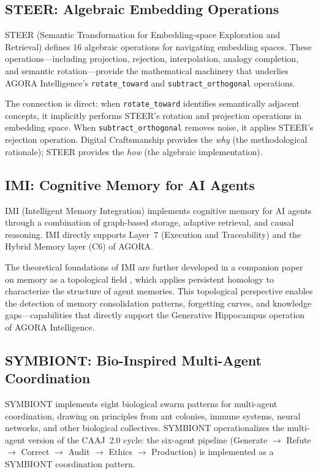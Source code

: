 \documentclass[11pt,a4paper]{article}
\begin{document}
\subsection{STEER: Algebraic Embedding Operations}

STEER (Semantic Transformation for Embedding-space Exploration and Retrieval) \citep{gomes2025steer} defines 16 algebraic operations for navigating embedding spaces. These operations---including projection, rejection, interpolation, analogy completion, and semantic rotation---provide the mathematical machinery that underlies AGORA Intelligence's \texttt{rotate\_toward} and \texttt{subtract\_orthogonal} operations.

The connection is direct: when \texttt{rotate\_toward} identifies semantically adjacent concepts, it implicitly performs STEER's rotation and projection operations in embedding space. When \texttt{subtract\_orthogonal} removes noise, it applies STEER's rejection operation. Digital Craftsmanship provides the \emph{why} (the methodological rationale); STEER provides the \emph{how} (the algebraic implementation).

\subsection{IMI: Cognitive Memory for AI Agents}

IMI (Intelligent Memory Integration) \citep{gomes2025imi} implements cognitive memory for AI agents through a combination of graph-based storage, adaptive retrieval, and causal reasoning. IMI directly supports Layer~7 (Execution and Traceability) and the Hybrid Memory layer (C6) of AGORA.

The theoretical foundations of IMI are further developed in a companion paper on memory as a topological field \citep{gomes2025imi_theory}, which applies persistent homology \citep{edelsbrunner2002topological} to characterize the structure of agent memories. This topological perspective enables the detection of memory consolidation patterns, forgetting curves, and knowledge gaps---capabilities that directly support the Generative Hippocampus operation of AGORA Intelligence.

\subsection{SYMBIONT: Bio-Inspired Multi-Agent Coordination}

SYMBIONT \citep{gomes2025symbiont} implements eight biological swarm patterns for multi-agent coordination, drawing on principles from ant colonies, immune systems, neural networks, and other biological collectives. SYMBIONT operationalizes the multi-agent version of the CAAJ~2.0 cycle: the six-agent pipeline (Generate $\rightarrow$ Refute $\rightarrow$ Correct $\rightarrow$ Audit $\rightarrow$ Ethics $\rightarrow$ Production) is implemented as a SYMBIONT coordination pattern.
\end{document}
